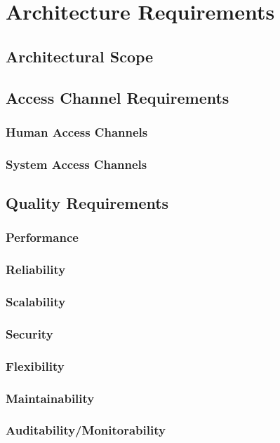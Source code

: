 \documentclass[11pt,fleqn]{book} %
\begin{document}
	\chapter{Architecture Requirements}
	
	\section{Architectural Scope}
	\section{Access Channel Requirements}
	\subsection{Human Access Channels}
	\subsection{System Access Channels}
	
	\section{Quality Requirements}
	\subsection{Performance}
	\subsection{Reliability}
	\subsection{Scalability}
	\subsection{Security}
	\subsection{Flexibility}
	\subsection{Maintainability}
	\subsection{Auditability/Monitorability}
\end{document}
